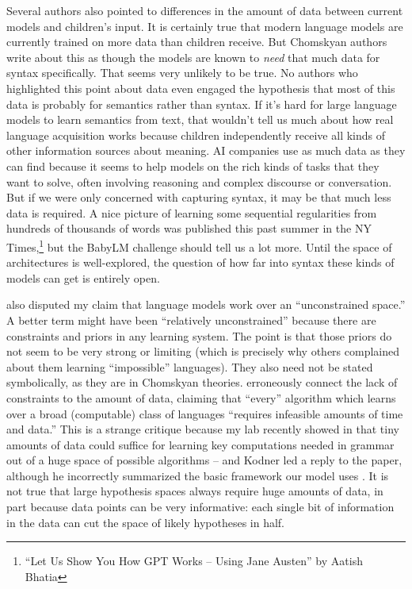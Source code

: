 \documentclass[output=paper,colorlinks,citecolor=brown
]{langscibook}
\begin{document}
Several authors also pointed to differences in the amount of data between current models and children's input. It is certainly true that modern language models are currently trained on more data than children receive. But Chomskyan authors write about this as though the models are known to \textit{need} that much data for syntax specifically. That seems very unlikely to be true. No authors who highlighted this point about data even engaged the hypothesis that most of this data is probably for semantics rather than syntax. If it's hard for large language models to learn semantics from text, that wouldn't tell us much about how real language acquisition works because children independently receive all kinds of other information sources about meaning. AI companies use as much data as they can find because it seems to help models on the rich kinds of tasks that they want to solve, often involving reasoning and complex discourse or conversation. But if we were only concerned with capturing syntax, it may be that much less data is required. A nice picture of learning some sequential regularities from hundreds of thousands of words was published this past summer in the NY Times,\footnote{``Let Us Show You How GPT Works -- Using Jane Austen'' by  Aatish Bhatia} but the BabyLM challenge should tell us a lot more. Until the space of architectures is well-explored, the question of how far into syntax these kinds of models can get is entirely open. 

\citet{kodner2023linguistics} also disputed my claim that language models work over an ``unconstrained space.'' A better term might have been ``relatively unconstrained'' because there are constraints and priors in any learning system. The point is that those priors do not seem to be very strong or limiting (which is precisely why others complained about them learning ``impossible'' languages). They also need not be stated symbolically, as they are in Chomskyan theories. \citet{kodner2023linguistics} erroneously connect the lack of constraints to the amount of data, claiming that ``every'' algorithm which learns over a broad (computable) class of languages ``requires infeasible amounts of time and data.'' This is a strange critique because my lab recently showed in \citet{yang2022one} that tiny amounts of data could suffice for learning key computations needed in grammar out of a huge space of possible algorithms -- and Kodner led a reply to the paper,  although he incorrectly summarized the basic framework our model uses \citep{piantadosi2022reply}. It is not true that large hypothesis spaces always require huge amounts of data, in part because data points can be very informative: each single bit of information in the data can cut the space of likely hypotheses in half. 
\end{document}
